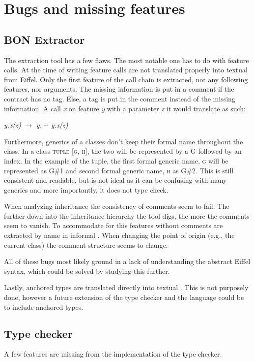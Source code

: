 \section{Bugs and missing features}
\subsection{BON Extractor}
The \bon{} extraction tool has a few flaws. The most notable one has to do with feature calls. At the time of writing feature calls are not translated properly into textual \bon{} from Eiffel. Only the first feature of the call chain is extracted, not any following features, nor arguments. The missing information is put in a comment if the contract has no tag. Else, a tag is put in the comment instead of the missing information. A call \textit{x} on feature \textit{y} with a parameter \textit{z} it would translate as such:
\begin{center}
\textit{y.x(z)} $\rightarrow$ \textit{y.} -\-- \textit{y.x(z)}
\end{center}

Furthermore, generics of a classes don't keep their formal name throughout the class. In a class \textsc{tuple [g, h]}, the two will be represented by a G followed by an index. In the example of the tuple, the first formal generic name, \textsc{g} will be represented as G\#1 and second formal generic name, \textsc{h} as G\#2. This is still consistent and readable, but is not ideal as it can be confusing with many generics and more importantly, it does not type check.

When analyzing inheritance the consistency of comments seem to fail. The further down into the inheritance hierarchy the tool digs, the more the comments seem to vanish. To accommodate for this features without comments are extracted by name in informal \bon. When changing the point of origin (e.g., the current class) the comment structure seems to change.

All of these bugs most likely ground in a lack of understanding the abstract Eiffel syntax, which could be solved by studying this further.

Lastly, anchored types are translated directly into textual \bon. This is not purposely done, however a future extension of the type checker and the \bon{} language could be to include anchored types.

\subsection{Type checker}
A few features are missing from the implementation of the type checker.

